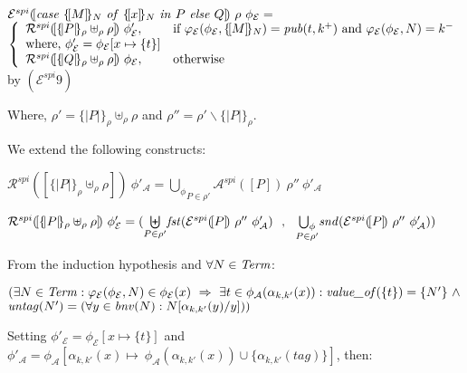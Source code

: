 \documentclass[10pt,a4paper,final,oneside,fleqn]{book}
\begin{document}
\noindent
$\mathcal{E}^{spi}(\![\mbox{{\itshape case\/} }\{\![M]\!\}_N\mbox{ {\itshape of\/} }\{\![x]\!\}_N\mbox{ {\itshape in\/} }P\mbox{ {\itshape else\/} }Q]\!)~\rho~\phi_\mathcal{E}=$\\
$\left\{\begin{array}{ll} \mathcal{R}^{spi}(\![\{\!|P|\!\}_\rho\uplus_\rho\rho]\!)~\phi'_\mathcal{E},&\mbox{if }\varphi_\mathcal{E}(\phi_\mathcal{E},\{\![M]\!\}_N)=\mbox{{\itshape pub\/}}(t,k^+)\mbox{ and }\varphi_\mathcal{E}(\phi_\mathcal{E},N)=k^-\\
\mbox{where, }\phi'_\mathcal{E}=\phi_\mathcal{E}[x\mapsto\{t\}]&\\
\mathcal{R}^{spi}(\![\{\!|Q|\!\}_\rho\uplus_\rho\rho]\!)~\phi_\mathcal{E},&\mbox{otherwise}\\
\end{array}\right.$\hfill by $(\mathcal{E}^{spi} 9)$\vspace{5mm}

\noindent
Where, $\rho'=\{\!|P|\!\}_\rho\uplus_\rho\rho$ and $\rho''=\rho'\backslash\{\!|P|\!\}_\rho$.\vspace{5mm}

\noindent
We extend the following constructs:

\noindent
$\mathcal{R}^{spi}(\![\{\!|P|\!\}_\rho\uplus_\rho\rho]\!)~\phi'_\mathcal{A}=\underset{P\in\rho'}{\bigcup_\phi}\mathcal{A}^{spi}(\![P]\!)~\rho''~\phi'_\mathcal{A}$

\noindent
$\mathcal{R}^{spi}(\![\{\!|P|\!\}_\rho\uplus_\rho\rho]\!)~\phi'_\mathcal{E}=(\underset{P\in\rho'}{\biguplus}\mbox{{\itshape fst\/}}(\mathcal{E}^{spi}(\![P]\!)~\rho''~\phi'_\mathcal{A})~~,~~\underset{P\in\rho'}{\bigcup_\phi}\mbox{{\itshape snd\/}}(\mathcal{E}^{spi}(\![P]\!)~\rho''~\phi'_\mathcal{A}))$\vspace{5mm}

\noindent
From the induction hypothesis and $\forall N\in\mbox{{\itshape Term\/}}$:

\noindent
$(\exists N\in\mbox{{\itshape Term\/}}:\varphi_\mathcal{E}(\phi_\mathcal{E},N)\in\phi_\mathcal{E}(x)~\Rightarrow~\exists t\in\phi_\mathcal{A}(\alpha_{k,k'}(x)):\mbox{{\itshape value\_of\/}}(\{t\})=\{N'\}~\wedge$\\
$\mbox{{\itshape untag\/}}(N')=(\forall y\in\mbox{{\itshape bnv\/}}(N):N[\alpha_{k,k'}(y)/y]))$\vspace{5mm}

\noindent
Setting $\phi'_\mathcal{E}=\phi_\mathcal{E}[x\mapsto\{t\}]$ and $\phi'_\mathcal{A}=\phi_\mathcal{A}[\alpha_{k,k'}(x)\mapsto~\phi_\mathcal{A}(\alpha_{k,k'}(x))\cup\{\alpha_{k,k'}({tag})\}]$, then:
\end{document}
